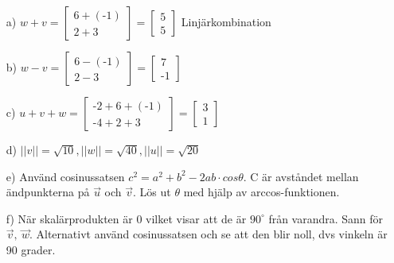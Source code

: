 \begin{itemize}
	\item [a) ] $w+v = \begin{bmatrix}6+(\text{-}1)\\ 2+3\end{bmatrix} =\begin{bmatrix} 5\\ 5 \end{bmatrix}$ Linjärkombination
	\item [b) ] $w-v = \begin{bmatrix}6-(\text{-}1)\\ 2-3\end{bmatrix} = \begin{bmatrix} 7\\ \text{-}1\end{bmatrix}$
	\item [c) ] $u+v+w= \begin{bmatrix}\text{-}2+6+(\text{-}1)\\ \text{-}4+2+3\end{bmatrix} = \begin{bmatrix}3\\ 1\end{bmatrix}$
	\item [d) ] $||v||=\sqrt{10}, ||w||=\sqrt{40}, ||u||=\sqrt{20}$
	\item [e) ] Använd cosinussatsen $c^2=a^2+b^2-2ab\cdot cos \theta$. C är avståndet mellan ändpunkterna på $\vec{u}$ och $\vec{v}$. Lös ut $\theta$ med hjälp av arccos-funktionen. 
	\item [f) ] När skalärprodukten är 0 vilket visar att de är $90^{\circ}$ från varandra. Sann för $\vec{v},\ \vec{w}$. Alternativt använd cosinussatsen och se att den blir noll, dvs vinkeln är 90 grader. 
\end{itemize}
